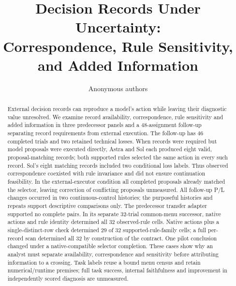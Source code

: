 \documentclass[10pt]{article}
\title{Decision Records Under Uncertainty:\\Correspondence, Rule Sensitivity, and Added Information}
\author{Anonymous authors}
\begin{document}
\raggedbottom
\maketitle
\begingroup\renewcommand{\thefootnote}{}\endgroup
\begin{abstract}
External decision records can reproduce a model's action while leaving their
diagnostic value unresolved. We examine record availability, correspondence,
rule sensitivity and added information in three predecessor panels and a
48-assignment follow-up separating record requirements from external execution.
The follow-up has 46 completed trials and two retained technical losses.
When records were required but model proposals were executed directly,
Astra and Sol each produced eight valid, proposal-matching records; both
supported rules selected the same action in every such record. Sol's eight
matching records included two conditional loss labels. Thus observed
correspondence coexisted with rule invariance and did not ensure continuation
feasibility. In the external-executor condition all completed proposals already
matched the selector, leaving correction of conflicting proposals unmeasured.
All follow-up P/L changes occurred in two continuous-control histories; the
purposeful histories and repeats support descriptive comparisons only.
The predecessor transfer adapter supported no complete pairs. In its separate
32-trial common-menu successor, native actions and rule identity determined
all 32 observed-rule cells. Native actions plus a single-distinct-row check
determined 29 of 32 supported-rule-family cells; a full per-record scan
determined all 32 by construction of the contract. One pilot conclusion
changed under a native-compatible selector completion. These cases show why
an analyst must separate availability, correspondence and sensitivity before
attributing information to a crossing. Task labels reuse a bound menu census
and retain numerical/runtime premises; full task success, internal faithfulness
and improvement in independently scored diagnosis are unmeasured.
\end{abstract}



\clearpage\appendix

\end{document}
